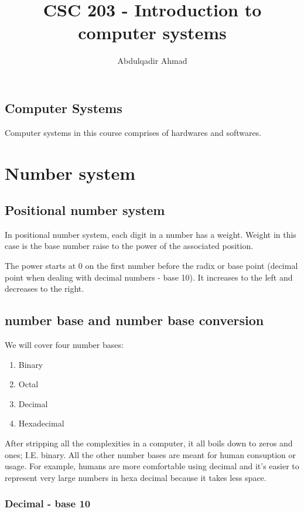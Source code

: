 \documentclass{ook}
\title{CSC 203 {-} Introduction to computer systems}
\author{Abdulqadir Ahmad}
\begin{document}
\maketitle
\tableofcontents
\section{Computer Systems}
Computer systems in this course comprises of hardwares and softwares.

\chapter{Number system}

\section{Positional number system}

In positional number system, each digit in a number has a weight. Weight in this case is the base number raise to the power of the associated position.

The power starts at 0 on the first number before the radix or base point (decimal point when dealing with decimal numbers {-} base 10). It increases to the left and decreases to the right.

\section{number base and number base conversion}

We will cover four number bases:

\begin{enumerate}
	\item Binary
	\item Octal
	\item Decimal
	\item Hexadecimal
\end{enumerate}

After stripping all the complexities in a computer, it all boils down to zeros and ones; I.E. binary. All the other number bases are meant for human consuption or usage. For example, humans are more comfortable using decimal and it's easier to represent very large numbers in hexa decimal because it takes less space.

\subsection{Decimal {-} base 10}
\end{document}
